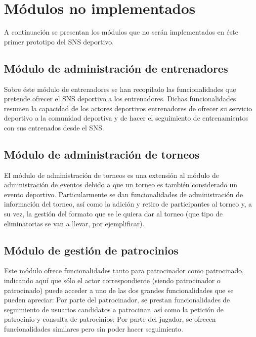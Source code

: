 \section{Módulos no implementados}

A continuación se presentan los módulos que no serán implementados en éste primer prototipo del SNS deportivo.

\subsection{Módulo de administración de entrenadores}



Sobre éste módulo de entrenadores se han recopilado las funcionalidades que pretende ofrecer el SNS deportivo a los entrenadores. Dichas funcionalidades resumen la capacidad de los actores deportivos entrenadores de ofrecer su servicio deportivo a la comunidad deportiva y de hacer el seguimiento de entrenamientos con sus entrenados desde el SNS.

\subsection{Módulo de administración de torneos}



El módulo de administración de torneos es una extensión al módulo de administración de eventos debido a que un torneo es también considerado un evento deportivo. Particularmente se dan funcionalidades de administración de información del torneo, así como la adición y retiro de participantes al torneo y, a su vez, la gestión del formato que se le quiera dar al torneo (que tipo de eliminatorias se van a llevar, por ejemplificar).

\subsection{Módulo de gestión de patrocinios}



Este módulo ofrece funcionalidades tanto para patrocinador como patrocinado, indicando aquí que sólo el actor correspondiente (siendo patrocinador o patrocinado) puede acceder a uno de las dos grandes funcionalidades que se pueden apreciar: Por parte del patrocinador, se prestan funcionalidades de seguimiento de usuarios candidatos a patrocinar, así como la petición de patrocinio y consulta de patrocinios; Por parte del jugador, se ofrecen funcionalidades similares pero sin poder hacer seguimiento.


